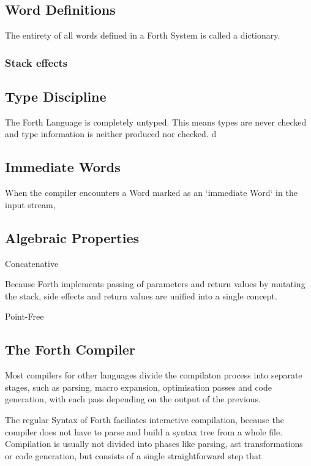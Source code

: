 \documentclass{llncs}
\begin{document}
\subsection{Word Definitions}

The entirety of all words defined in a Forth System is called a dictionary.

\subsubsection{Stack effects}



\subsection{Type Discipline}

The Forth Language is completely untyped. This means types are never checked and type information is neither produced nor checked. d

\subsection{Immediate Words}

When the compiler encounters a Word marked as an `immediate Word` in the input stream, 

\subsection{Algebraic Properties}

Concatenative

Because Forth implements passing of parameters and return values by mutating the stack, side effects and return values are unified into a single concept.

Point-Free


\subsection{The Forth Compiler}

Most compilers for other languages divide the compilaton process into separate stages, such as parsing, macro expansion, optimisation passes and code generation, with each pass depending on the output of the previous.

The regular Syntax of Forth faciliates interactive compilation, because the compiler does not have to parse and build a syntax tree from a whole file. 
Compilation is usually not divided into phases like parsing, ast transformations or code generation, but consists of a single straightforward step that 
\end{document}
